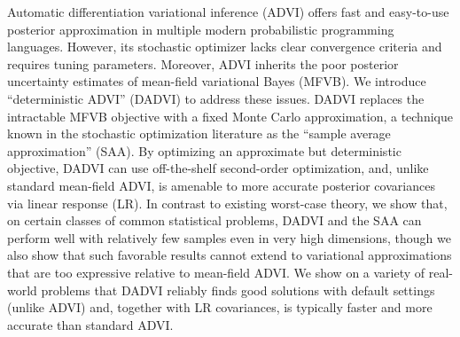 Automatic differentiation variational inference (ADVI) offers fast and
easy-to-use posterior approximation in multiple modern probabilistic programming
languages. However, its stochastic optimizer lacks clear convergence criteria
and requires tuning parameters. Moreover, ADVI inherits the poor posterior
uncertainty estimates of mean-field variational Bayes (MFVB).  We introduce
``deterministic ADVI'' (DADVI) to address these issues. DADVI replaces the
intractable MFVB objective with a fixed Monte Carlo approximation, a technique
known in the stochastic optimization literature as the ``sample average
approximation'' (SAA).  By optimizing an approximate but deterministic
objective, DADVI can use off-the-shelf second-order optimization, and, unlike
standard mean-field ADVI, is amenable to more accurate posterior covariances via
linear response (LR).  In contrast to existing worst-case theory, we show that,
on certain classes of common statistical problems, DADVI and the SAA can perform
well with relatively few samples even in very high dimensions, though we also
show that such favorable results cannot extend to variational approximations
that are too expressive relative to mean-field ADVI. We show on a variety of
real-world problems that DADVI reliably finds good solutions with default
settings (unlike ADVI) and, together with LR covariances, is typically faster
and more accurate than standard ADVI.